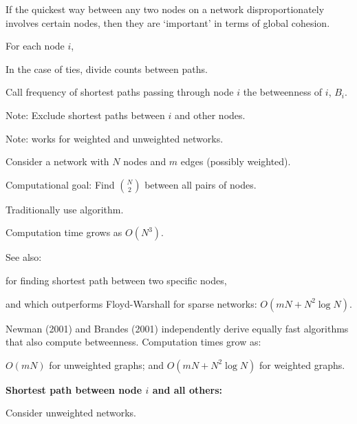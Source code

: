     If the quickest way between any two
    nodes on a network disproportionately 
    involves certain nodes, then they are
    `important' in terms of global cohesion.
  
    For each node $i$, 
   
    In the case of ties, 
    divide
    counts between paths.
   
    Call frequency of shortest paths passing
    through node $i$ the betweenness of $i$, $B_i$.
   
    Note: Exclude shortest paths between $i$ and other nodes.
   
    Note: works for weighted and unweighted networks.
  



  
   
    Consider a network with $N$ nodes and $m$ edges (possibly weighted).
   
    \alert{Computational goal:} Find 
    $\binom{N}{2}$
     between all pairs of nodes.
   
    Traditionally use  algorithm.
   
    Computation time grows as $O (N^3)$.
  
    See also: 
    
     
       for finding shortest path between two specific nodes,
     
      and  which outperforms Floyd-Warshall for sparse networks:
      $O (mN + N^2 \log N)$.
    
   
    Newman (2001)\cite{newman2001d,newman2004b} and Brandes (2001)\cite{brandes2001a} 
    independently derive equally fast algorithms that also compute betweenness.
  Computation times grow as:
      
       $O (mN)$ for unweighted graphs;
       and $O (mN + N^2 \log N)$ for weighted graphs.
      
  


  \textbf{Shortest path between node $i$ and all others:}  

    
     
      Consider unweighted networks.
     
